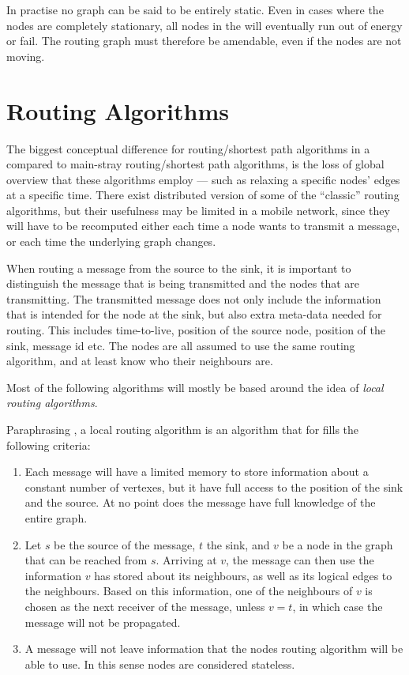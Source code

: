\documentclass[letter, 12pt, english, draft]{article}
\begin{document}
In practise no graph can be said to be entirely static. Even in cases where the nodes are completely stationary, all nodes in the \anet will eventually run out of energy or fail. The routing graph must therefore be amendable, even if the nodes are not moving. 

\section{Routing Algorithms}

The biggest conceptual difference for routing/shortest path algorithms in a \manet compared to main-stray routing/shortest path algorithms, is the loss of global overview that these algorithms employ --- such as relaxing a specific nodes' edges at a specific time. There exist distributed version of some of the ``classic'' routing algorithms, but their usefulness may be limited in a mobile network, since they will have to be recomputed either each time a node wants to transmit a message, or each time the underlying graph changes.

When routing a message from the source to the sink, it is important to distinguish the message that is being transmitted and the nodes that are transmitting. The transmitted message does not only include the information that is intended for the node at the sink, but also extra meta-data needed for routing. This includes time-to-live, position of the source node, position of the sink, message id etc. The nodes are all assumed to use the same routing algorithm, and at least know who their neighbours are.

Most of the following algorithms will mostly be based around the idea of \emph{local routing algorithms}. 

Paraphrasing \cite{compass}, a local routing algorithm is an algorithm that for fills the following criteria:
\begin{enumerate}
\item Each message will have a limited memory to store information about a constant number of vertexes, but it have full access to the position of the sink and the source. At no point does the message have full knowledge of the entire graph. 
\item Let $s$ be the source of the message, $t$ the sink, and $v$ be a node in the graph that can be reached from $s$. Arriving at $v$, the message can then use the information $v$ has stored about its neighbours, as well as its logical edges to the neighbours. Based on this information, one of the neighbours of $v$ is chosen as the next receiver of the message, unless $v = t$, in which case the message will not be propagated.
\item A message will not leave information that the nodes routing algorithm will be able to use. In this sense nodes are considered stateless.\end{enumerate}
\end{document}
